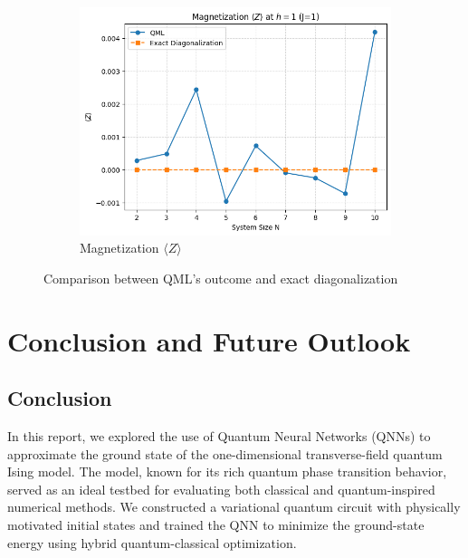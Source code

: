 \documentclass[pre,twocolumn,floatfix]{revtex4-1}
\begin{document}
\begin{figure}[htbp]
\begin{subfigure}[b]{0.32\textwidth}
        \label{(b)}
    \end{subfigure}
    \hfill %
    \begin{subfigure}[b]{0.32\textwidth}
        \centering
        \includegraphics[width=\linewidth]{images/cmp_Z.png} %
        \caption{Magnetization $\langle Z \rangle$}
        \label{(c)}
    \end{subfigure}
    
    \caption{Comparison between QML's outcome and exact diagonalization}
    \label{fig:three_images_together}
\end{figure}

\section{Conclusion and Future Outlook}
\subsection{Conclusion}
In this report, we explored the use of Quantum Neural Networks (QNNs) to approximate the ground state of the one-dimensional transverse-field quantum Ising model. The model, known for its rich quantum phase transition behavior, served as an ideal testbed for evaluating both classical and quantum-inspired numerical methods. We constructed a variational quantum circuit with physically motivated initial states and trained the QNN to minimize the ground-state energy using hybrid quantum-classical optimization.
\end{document}
